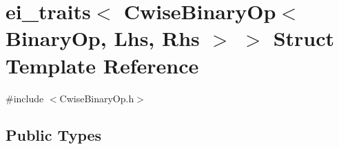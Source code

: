 \hypertarget{structei__traits_3_01_cwise_binary_op_3_01_binary_op_00_01_lhs_00_01_rhs_01_4_01_4}{\section{ei\-\_\-traits$<$ Cwise\-Binary\-Op$<$ Binary\-Op, Lhs, Rhs $>$ $>$ Struct Template Reference}
\label{structei__traits_3_01_cwise_binary_op_3_01_binary_op_00_01_lhs_00_01_rhs_01_4_01_4}
}


{\ttfamily \#include $<$Cwise\-Binary\-Op.\-h$>$}

\subsection*{Public Types}
